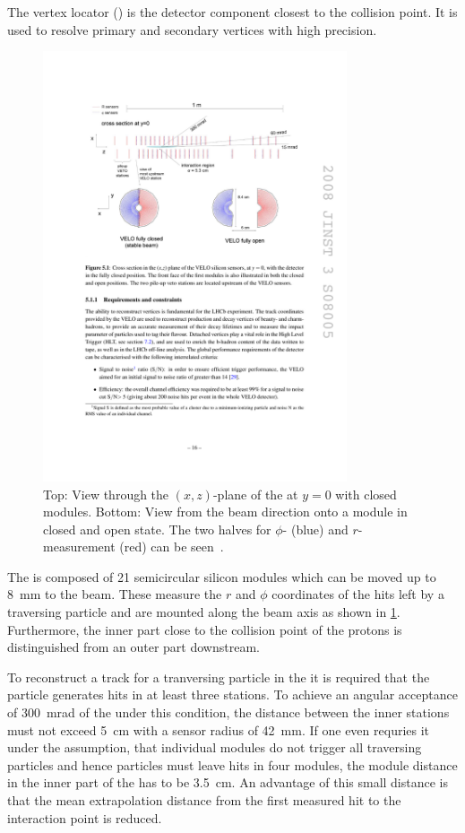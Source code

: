 The vertex locator (\velo) is the detector component closest to the collision point.
It is used to resolve primary and secondary vertices with high precision.
\begin{figure}[tbp]
    \centering
    \includegraphics[width=0.8\textwidth]{05lhcb/figs/velo.pdf}
    \caption{Top: View through the $(x,z)$-plane of the \velo at $y=0$ with closed modules.
    Bottom: View from the beam direction onto a module in closed and open state.
    The two halves for $\phi$- (blue) and $r$-measurement (red) can be seen~\cite{Alves:2008zz}.}
    \label{fig:velo}
\end{figure}
The \velo is composed of \num{21} semicircular silicon modules which can be moved up to \SI{8}{\milli\metre} to the beam.
These measure the $r$ and $\phi$ coordinates of the hits left by a traversing particle and are mounted along the beam axis as shown in \cref{fig:velo}.
Furthermore, the inner part close to the collision point of the protons is distinguished from an outer part downstream.

To reconstruct a track for a tranversing particle in the \velo it is required that the particle generates hits in at least three stations.
To achieve an angular acceptance of \SI{300}{\milli\radian} of the \velo under this condition, the distance between the inner stations must not exceed \SI{5}{\centi\metre} with a sensor radius of \SI{42}{\milli\metre}.
If one even requries it under the assumption, that individual modules do not trigger all traversing particles and hence particles must leave hits in four modules, the module distance in the inner part of the \velo has to be \SI{3.5}{\centi\metre}.
An advantage of this small distance is that the mean extrapolation distance from the first measured hit to the interaction point is reduced.


